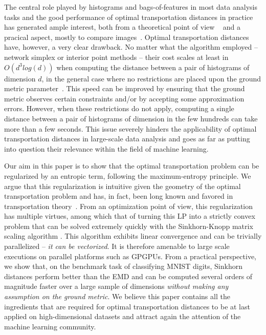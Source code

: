 \documentclass{amsart} %
\begin{document}
The central role played by histograms and bags-of-features in most data analysis tasks and the good performance of optimal transportation distances in practice has generated ample interest, both from a theoretical point of view ~\citep{levina2001earth,indyk,naor-2005,indyk2009} and a pracical aspect, mostly to compare images~\citep{GraumanD04,ling2007efficient,gudmundsson2007small,shirdhonkar2008approximate}. Optimal transportation distances have, however, a very clear drawback. No matter what the algorithm employed -- network simplex or interior point methods -- their cost scales at least in $O(d^3log(d))$ when computing the distance between a pair of histograms of dimension $d$, in the general case where no restrictions are placed upon the ground metric parameter~\citep[\S2.1]{Pele-iccv2009}. This speed can be improved by ensuring that the ground metric observes certain constraints and/or by accepting some approximation errors. However, when these restrictions do not apply, computing a single distance between a pair of histograms of dimension in the few hundreds can take more than a few seconds. This issue severely hinders the applicability of optimal transportation distances in large-scale data analysis and goes as far as putting into question their relevance within the field of machine learning.

Our aim in this paper is to show that the optimal transportation problem can be regularized by an entropic term, following the maximum-entropy principle. We argue that this regularization is intuitive given the geometry of the optimal transportation problem and has, in fact, been long known and favored in transportation theory~\citep{erlander1990gravity}. From an optimization point of view, this regularization has multiple virtues, among which that of turning this LP into a strictly convex problem that can be solved extremely quickly with the Sinkhorn-Knopp matrix scaling algorithm  \citep{sinkhorn1967concerning,knight2008sinkhorn}. This algorithm exhibits  linear convergence and can be trivially parallelized -- \emph{it can be vectorized}. It is therefore amenable to large scale executions on parallel platforms such as GPGPUs. From a practical perspective, we show that, on the benchmark task of classifying MNIST digits, Sinkhorn distances perform better than the EMD and can be computed several orders of magnitude faster over a large sample of dimensions \emph{without making any assumption on the ground metric}. We believe this paper contains all the ingredients that are required for optimal transportation distances to be at last applied on high-dimensional datasets and attract again the attention of the machine learning community.
\end{document}
